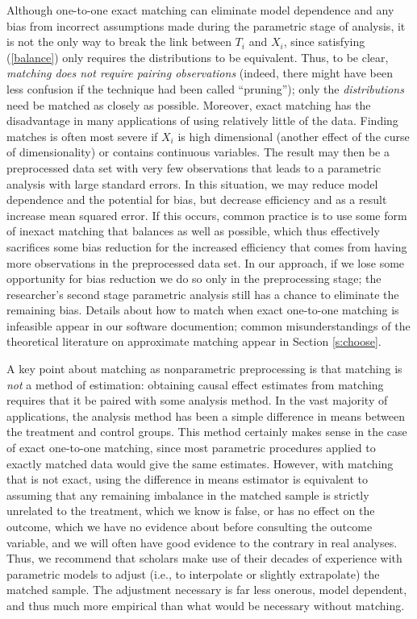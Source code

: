 \documentclass[11pt,titlepage]{article}
\begin{document}
Although one-to-one exact matching can eliminate model dependence and
any bias from incorrect assumptions made during the parametric stage
of analysis, it is not the only way to break the link between $T_i$
and $X_i$, since satisfying (\ref{balance}) only requires the
distributions to be equivalent.  Thus, to be clear, \emph{matching
  does not require pairing observations} (indeed, there might have
been less confusion if the technique had been called ``pruning'');
only the \emph{distributions} need be matched as closely as possible.
Moreover, exact matching has the disadvantage in many applications of
using relatively little of the data.  Finding matches is often most
severe if $X_i$ is high dimensional (another effect of the curse of
dimensionality) or contains continuous variables.  The result may then
be a preprocessed data set with very few observations that leads to a
parametric analysis with large standard errors.  In this situation, we
may reduce model dependence and the potential for bias, but decrease
efficiency and as a result increase mean squared error.  If this
occurs, common practice is to use some form of inexact matching that
balances as well as possible, which thus effectively sacrifices some
bias reduction for the increased efficiency that comes from having
more observations in the preprocessed data set.  In our approach, if
we lose some opportunity for bias reduction we do so only in the
preprocessing stage; the researcher's second stage parametric analysis
still has a chance to eliminate the remaining bias.  Details about how
to match when exact one-to-one matching is infeasible appear in our
software documention; common misunderstandings of the theoretical
literature on approximate matching appear in Section \ref{s:choose}.

A key point about matching as nonparametric preprocessing is that
matching is \emph{not} a method of estimation: obtaining causal effect
estimates from matching requires that it be paired with some analysis
method.  In the vast majority of applications, the analysis method has
been a simple difference in means between the treatment and control
groups.  This method certainly makes sense in the case of exact
one-to-one matching, since most parametric procedures applied to
exactly matched data would give the same estimates.  However, with
matching that is not exact, using the difference in means estimator is
equivalent to assuming that any remaining imbalance in the matched
sample is strictly unrelated to the treatment, which we know is false,
or has no effect on the outcome, which we have no evidence about
before consulting the outcome variable, and we will often have good
evidence to the contrary in real analyses.  Thus, we recommend that
scholars make use of their decades of experience with parametric
models to adjust (i.e., to interpolate or slightly extrapolate) the
matched sample.  The adjustment necessary is far less onerous, model
dependent, and thus much more empirical than what would be necessary
without matching.
\end{document}
